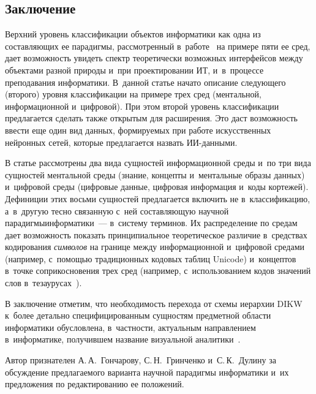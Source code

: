 \begin{multicols}{2}
\section{Заключение}

  Верхний уровень классификации объектов информатики как одна из 
со\-став\-ля\-ющих ее парадигмы, рас\-смот\-рен\-ный в~работе~\cite{8-zac} на примере 
пяти ее сред, дает возможность увидеть спектр \mbox{тео\-ре\-ти\-че\-ски} воз\-мож\-ных 
интерфейсов между объектами разной природы и~при проектировании ИТ, 
и~в~процессе преподавания информатики. В~данной \mbox{статье} начато описание 
следующего (второго) уровня классификации на примере трех сред 
(ментальной, информационной и~циф\-ро\-вой). При этом второй уровень 
классификации предлагается сделать также открытым для расширения. Это 
даст воз\-мож\-ность ввести еще один вид данных, формируемых при работе 
искусственных нейронных сетей, которые предлагается назвать ИИ-дан\-ными.

  
  В статье рассмотрены два вида сущностей информационной среды и~по три 
вида сущностей ментальной среды (знание, концепты и~ментальные образы 
данных) и~циф\-ро\-вой среды (циф\-ро\-вые данные, цифровая информация и~коды 
кортежей). Дефиниции этих восьми сущностей предлагается включить не 
в~классификацию, а~в~другую тесно связанную с~ней со\-став\-ля\-ющую научной 
парадигмы\linebreak информатики~--- в~систему терминов. Их распределение по средам 
дает возможность показать принципиальное тео\-ре\-ти\-че\-ское различие 
в~средствах \mbox{кодирования} \textit{символов} на границе между информационной 
и~циф\-ро\-вой средами (например, с~по\-мощью традиционных кодовых таб\-лиц 
Unicode) и~концептов в~точке соприкосновения трех сред (например, 
с~использованием кодов значений слов в~тезаурусах~\cite{5-zac}).
  
  В заключение отметим, что необходимость перехода от схемы иерархии 
DIKW к~более детально специфицированным сущностям предметной об\-ласти 
информатики обуслов\-ле\-на, в~част\-ности, актуальным на\-прав\-ле\-ни\-ем 
в~информатике, получившем название визуальной  
аналитики~\cite{4-zac, 38-zac}.
  
  \bigskip
  
  Автор признателен А.\,А.~Гончарову, С.\,Н.~Гринченко и~С.\,К.~Дулину за 
обсуждение предлагаемого варианта научной парадигмы информатики и~их 
предложения по редактированию ее положений.
   

\end{multicols}
